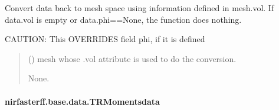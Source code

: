 \documentclass[letterpaper,10pt,english]{sphinxmanual}
\begin{document}
\begin{fulllineitems}
\begin{fulllineitems}
\label{\detokenize{_autosummary/nirfasterff.base.data.TPSFdata:nirfasterff.base.data.TPSFdata.tomesh}}
\pysigstartsignatures
\pysiglinewithargsret
{}
{}
{}
\pysigstopsignatures
\sphinxAtStartPar
Convert data back to mesh space using information defined in mesh.vol. If data.vol is empty or data.phi==None, the function does nothing.

\sphinxAtStartPar
CAUTION: This OVERRIDES field phi, if it is defined
\begin{quote}\begin{description}
\sphinxAtStartPar
{} () \textendash{} mesh whose .vol attribute is used to do the conversion.

\sphinxAtStartPar
None.

\end{description}\end{quote}

\end{fulllineitems}


\end{fulllineitems}


\sphinxstepscope


\paragraph{nirfasterff.base.data.TRMomentsdata}
\label{\detokenize{_autosummary/nirfasterff.base.data.TRMomentsdata:nirfasterff-base-data-trmomentsdata}}\label{\detokenize{_autosummary/nirfasterff.base.data.TRMomentsdata::doc}}
\end{document}
